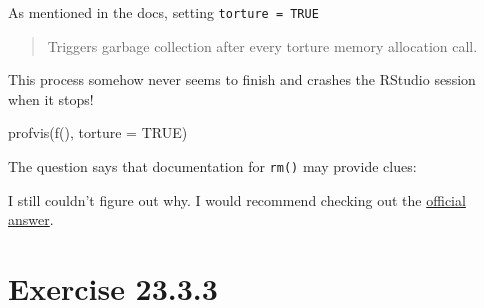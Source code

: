 \documentclass[
]{book}
\newenvironment{Shaded}{\begin{snugshade}}{\end{snugshade}}
\newcommand{\AttributeTok}[1]{\textcolor[rgb]{0.77,0.63,0.00}{#1}}
\newcommand{\CommentTok}[1]{\textcolor[rgb]{0.56,0.35,0.01}{\textit{#1}}}
\newcommand{\ConstantTok}[1]{\textcolor[rgb]{0.00,0.00,0.00}{#1}}
\newcommand{\FunctionTok}[1]{\textcolor[rgb]{0.00,0.00,0.00}{#1}}
\newcommand{\NormalTok}[1]{#1}
\begin{document}
As mentioned in the docs, setting \texttt{torture\ =\ TRUE}

\begin{quote}
Triggers garbage collection after every torture memory allocation call.
\end{quote}

This process somehow never seems to finish and crashes the RStudio session when it stops!

\begin{Shaded}
\begin{Highlighting}[]
\FunctionTok{profvis}\NormalTok{(}\FunctionTok{f}\NormalTok{(), }\AttributeTok{torture =} \ConstantTok{TRUE}\NormalTok{)}
\end{Highlighting}
\end{Shaded}

The question says that documentation for \texttt{rm()} may provide clues:

\begin{Shaded}
\end{Shaded}

I still couldn't figure out why. I would recommend checking out the \href{https://advanced-r-solutions.rbind.io/measuring-performance.html\#profiling}{official answer}.

\hypertarget{exercise-23.3.3}{%
\section{Exercise 23.3.3}\label{exercise-23.3.3}}
\end{document}
